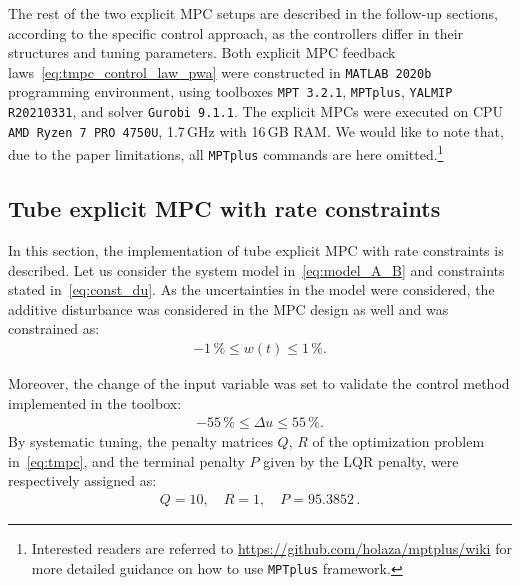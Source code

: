 \documentclass[letterpaper, 10 pt, conference]{ieeeconf}
\begin{document}
	The rest of the two explicit MPC setups are described in the follow-up sections, according to the specific control approach, as the controllers differ in their structures and tuning parameters. Both explicit MPC feedback laws~\eqref{eq:tmpc_control_law_pwa} were constructed in \texttt{MATLAB 2020b} programming environment, using toolboxes  \texttt{MPT 3.2.1}, \texttt{MPTplus}, \texttt{YALMIP R20210331},
	and solver \texttt{Gurobi 9.1.1}. The explicit MPCs were executed on
	CPU \texttt{AMD Ryzen 7 PRO 4750U}, 1.7\,GHz with 16\,GB RAM. 
	We would like to note that, due to the paper limitations, all \texttt{MPTplus} commands are here omitted.\footnote{Interested readers are referred to \url{https://github.com/holaza/mptplus/wiki} for more detailed guidance on how to use \texttt{MPTplus} framework.}
	
	
	
	\subsection{Tube explicit MPC with rate constraints}
	\label{sec:tube_exp}
	
	In this section, the implementation of tube explicit MPC with rate constraints is described. Let us consider the system model in~\eqref{eq:model_A_B} and constraints stated in~\eqref{eq:const_du}. 
	As the uncertainties in the model were considered, the additive disturbance was considered in the MPC design as well and was constrained as:
	\begin{eqnarray}
		\label{eq:const_w}
		-1\,\% \le w(t) \le 1\,\%.
	\end{eqnarray}
	
	Moreover, the change of the input variable was set to validate the control method implemented in the toolbox:
	\begin{eqnarray}
		\label{eq:const_du}
		-55\,\% \le \Delta u \le 55\,\%.
	\end{eqnarray}
	By systematic tuning, the penalty matrices $Q$, $R$ of the optimization problem in~\eqref{eq:tmpc}, and the terminal penalty $P$ given by the LQR penalty, were respectively assigned as:
	\begin{eqnarray}
		\label{eq:setup_penalty}
		Q = 10, \quad R = 1, \quad P = 95.3852 \, .
	\end{eqnarray}
	
\end{document}

